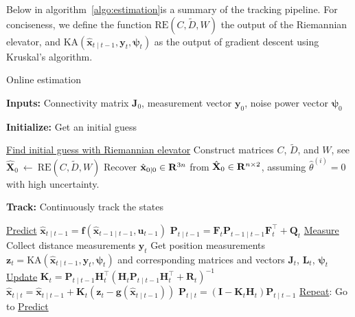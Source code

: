 Below in algorithm~\ref{algo:estimation}is a summary of the tracking pipeline. For conciseness, we define the function $\text{RE}(C, \tilde{D}, W)$ the output of the Riemannian elevator, and $\text{KA}(\hat{\mathbf{x}}_{t \mid t-1}, \mathbf{y}_t, \bm{\psi}_t)$ as the output of gradient descent using Kruskal's algorithm. 

\begin{algorithm}
    \caption{Online estimation}\label{algo:estimation}
    \textbf{Inputs:} Connectivity matrix $\mathbf{J}_0$, measurement vector $\mathbf{y}_0$, noise power vector $\bm{\psi}_0$
    
    \textbf{Initialize:} Get an initial guess
    \begingroup{} %
    \begin{algorithmic}[1]
        \Statex \underline{Find initial guess with Riemannian elevator}
        \State Construct matrices $C$, $\tilde{D}$, and $W$, see \cite{R_elevator}
        \State $\hat{\mathbf{X}}_0 \ \leftarrow\ \text{RE}(C, \tilde{D}, W)$
        \State Recover $\hat{\mathbf{x}}_{0 \mid 0} \in \mathbf{R}^{3n}$ from $\hat{\mathbf{X}}_0 \in \mathbf{R}^{n \times 2}$, assuming $\hat{\theta}^{(i)} = 0$ with high uncertainty.
    \end{algorithmic}

    \textbf{Track:} Continuously track the states
    \begin{algorithmic}[1]
        \Statex \underline{Predict}
        \State $\hat{\mathbf{x}}_{t \mid t-1} = \mathbf{f}(\hat{\mathbf{x}}_{t-1 \mid t-1}, \mathbf{u}_{t-1})$
        \State $\mathbf{P}_{t \mid t-1} = \mathbf{F}_t \mathbf{P}_{t-1 \mid t-1} \mathbf{F}_t^\top + \mathbf{Q}_t$
        \Statex \underline{Measure}
        \State Collect distance measurements $\mathbf{y}_t$
        \State Get position measurements $\mathbf{z}_t = \text{KA}(\hat{\mathbf{x}}_{t \mid t-1}, \mathbf{y}_t, \bm{\psi}_t)$ and corresponding matrices and vectors $\mathbf{J}_t$, $\mathbf{L}_t$, $\bm{\psi}_t$
        \Statex \underline{Update}
        \State $\mathbf{K}_t = \mathbf{P}_{t \mid t-1} \mathbf{H}^\top_t (\mathbf{H}_t \mathbf{P}_{t \mid t-1} \mathbf{H}_t^\top + \mathbf{R}_t)^{-1}$
        \State $\hat{\mathbf{x}}_{t \mid t} = \hat{\mathbf{x}}_{t\mid t-1} + \mathbf{K}_t (\mathbf{z}_t - \mathbf{g}(\hat{\mathbf{x}}_{t \mid t-1}))$
        \State $\mathbf{P}_{t \mid t} = (\mathbf{I} - \mathbf{K}_t \mathbf{H}_t) \mathbf{P}_{t \mid t-1}$
        \Statex \underline{Repeat}: Go to \underline{Predict}
    \end{algorithmic}
    \endgroup
\end{algorithm}